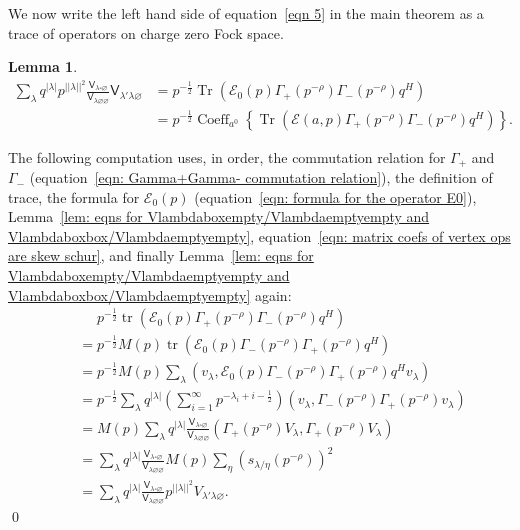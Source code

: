 \documentclass[12pt]{amsart}
\newcommand{\Vsf}{\mathsf{V}}
\newcommand{\bx}{\square}
\renewcommand{\emptyset}{\varnothing}
\newcommand{\half}{\frac{1}{2}}
\newtheorem{lemma}[theorem]{Lemma}
\theoremstyle{definition}
\newcommand{\tr}{\operatorname{tr}}
\newcommand{\E}{\mathcal{E}}
\newcommand{\ptotheminusrho}{p^{-\rho}}
\begin{document}
We now write the left hand side of equation~\eqref{eqn 5} in the main
theorem as a trace of operators on charge zero Fock space.
\begin{lemma}\label{lem: eqn 5 written as a trace}
\begin{align*}
\sum_{\lambda} q^{|\lambda |} p^{||\lambda ||^{2}} \frac{\Vsf_{\lambda
\bx \emptyset}}{\Vsf_{\lambda \emptyset \emptyset}} \Vsf_{\lambda
'\lambda \emptyset}& = p^{-\half} \operatorname{Tr} \left(\E
_0(p)\Gamma_{+}(\ptotheminusrho )\Gamma_{-}(\ptotheminusrho )q^{H} \right)\\
& = p^{-\half} \operatorname{Coeff}_{a^{0}}\left\{\operatorname{Tr} \left(\E(a,p)\Gamma_{+}(\ptotheminusrho )\Gamma_{-}(\ptotheminusrho )q^{H} \right) \right\}.
\end{align*}
\end{lemma}
\proof The following computation uses, in order, the commutation
relation for $\Gamma_{+}$ and $\Gamma_{-}$ (equation~\eqref{eqn:
Gamma+Gamma- commutation relation}), the definition of trace, the
formula for $\E_{0} (p)$ (equation~\eqref{eqn: formula for the
operator E0}), Lemma~\ref{lem: eqns for
Vlambdaboxempty/Vlambdaemptyempty and
Vlambdaboxbox/Vlambdaemptyempty}, equation~\eqref{eqn: matrix coefs of
vertex ops are skew schur}, and finally Lemma~\ref{lem: eqns for
Vlambdaboxempty/Vlambdaemptyempty and Vlambdaboxbox/Vlambdaemptyempty}
again:
\begin{align*}
\quad &\,\, \quad p^{-\half} \tr \left(\E_{0}(p)\Gamma_{+}(\ptotheminusrho )\Gamma_{-}(\ptotheminusrho )q^{H} \right)\\
& = p^{-\half} M(p) \tr \left(\E_{0}(p)\Gamma_{-}(\ptotheminusrho )\Gamma_{+}(\ptotheminusrho )q^{H} \right)\\
&=p^{-\half}M(p)\sum_{\lambda} \left(v_{\lambda}, \E_{0}(p)\Gamma_{-}(\ptotheminusrho )\Gamma_{+}(\ptotheminusrho )q^{H} v_{\lambda}\right)\\
&=p^{-\half } \sum_{\lambda} q^{|\lambda |} \left(\sum_{i=1}^{\infty}
p^{-\lambda_{i}+i-\half} \right) \left(v_{\lambda}, \Gamma_{-}(\ptotheminusrho )\Gamma_{+}(\ptotheminusrho )v_{\lambda} \right)\\
&=M(p)\sum_{\lambda}q^{|\lambda |} \frac{\Vsf_{\lambda \bx
\emptyset}}{\Vsf_{\lambda \emptyset \emptyset}} \left(\Gamma_{+}(\ptotheminusrho )V_{\lambda },\Gamma_{+}(\ptotheminusrho )V_{\lambda } \right)\\
&= \sum_{\lambda} q^{|\lambda |} \frac{\Vsf_{\lambda \bx
\emptyset}}{\Vsf_{\lambda \emptyset \emptyset}} M(p)\sum_{\eta} \left(s_{\lambda /\eta}(\ptotheminusrho ) \right)^{2}\\
&= \sum_{\lambda} q^{|\lambda |} \frac{\Vsf_{\lambda \bx
\emptyset}}{\Vsf_{\lambda \emptyset \emptyset}} p^{||\lambda ||^{2}}
V_{\lambda '\lambda \emptyset} .
\end{align*}
\qed 
\end{document}
